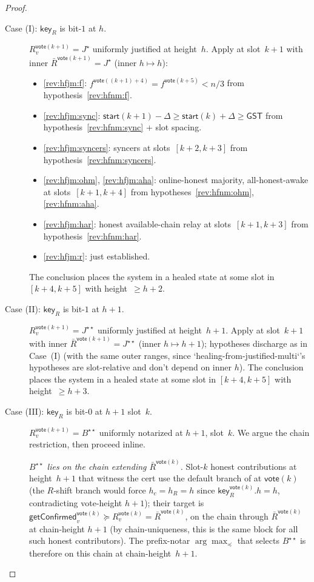\ifx\litemode\undefined\documentclass{article}\fi
\newcommand{\key}{\mathsf{key}}
\newcommand{\start}{\mathsf{start}}
\newcommand{\vote}{\mathsf{vote}}
\newcommand{\comm}[1]{\bar{#1}}
\newcommand{\getConfirmed}{\textsf{getConfirmed}\xspace}
\theoremstyle{plain}
\theoremstyle{definition}
\theoremstyle{remark}
\newcommand{\GST}{\ensuremath{\mathsf{GST}}}
\newcommand{\OHM}{online-honest majority\xspace}
\newcommand{\HAR}{honest available-chain relay\xspace}
\newcommand{\AHA}{all-honest-awake\xspace}
\begin{document}
\begin{proof}
\begin{description}
\item[{Case (I): $\key_R$ is bit-$1$ at $h$.}]\hfill

$R_v^{\vote(k+1)} = J^\star$ uniformly justified at height~$h$. Apply  at slot~$k+1$ with inner $\comm{R}^{\vote(k+1)} = J^\star$ (inner $h \mapsto h$):
\begin{itemize}
  \item \ref{rev:hfjm:f}: $f^{\vote((k+1)+4)} = f^{\vote(k+5)} < n/3$ from hypothesis~\ref{rev:hfnm:f}.
  \item \ref{rev:hfjm:sync}: $\start(k+1) - \Delta \geq \start(k) + \Delta \geq \GST$ from hypothesis~\ref{rev:hfnm:sync} + slot spacing.
  \item \ref{rev:hfjm:syncers}: syncers at slots~$[k+2, k+3]$ from hypothesis~\ref{rev:hfnm:syncers}.
  \item \ref{rev:hfjm:ohm}, \ref{rev:hfjm:aha}: \OHM, \AHA at slots~$[k+1, k+4]$ from hypotheses~\ref{rev:hfnm:ohm}, \ref{rev:hfnm:aha}.
  \item \ref{rev:hfjm:har}: \HAR at slots~$[k+1, k+3]$ from hypothesis~\ref{rev:hfnm:har}.
  \item \ref{rev:hfjm:r}: just established.
\end{itemize}
The conclusion places the system in a healed state at some slot in $[k+4, k+5]$ with height~$\geq h+2$.

\item[{Case (II): $\key_R$ is bit-$1$ at $h+1$.}]\hfill

$R_v^{\vote(k+1)} = J^{\star\star}$ uniformly justified at height~$h+1$. Apply  at slot~$k+1$ with inner $\comm{R}^{\vote(k+1)} = J^{\star\star}$ (inner $h \mapsto h+1$); hypotheses discharge as in Case~(I) (with the same outer ranges, since `healing-from-justified-multi`'s hypotheses are slot-relative and don't depend on inner $h$). The conclusion places the system in a healed state at some slot in $[k+4, k+5]$ with height~$\geq h+3$.

\item[{Case (III): $\key_R$ is bit-$0$ at $h+1$ slot~$k$.}]\hfill

$R_v^{\vote(k+1)} = B^{\star\star}$ uniformly notarized at $h+1$, slot~$k$. We argue the chain restriction, then proceed inline.

\emph{$B^{\star\star}$ lies on the chain extending $\comm{R}^{\vote(k)}$.}
Slot-$k$ honest contributions at height~$h+1$ that witness the cert use the default branch of  at $\vote(k)$ (the $R$-shift branch would force $h_c = h_R = h$ since $\key_R^{\vote(k)}.h = h$, contradicting vote-height $h+1$); their target is $\getConfirmed_v^{\vote(k)} \succeq R_v^{\vote(k)} = \comm{R}^{\vote(k)}$, on the chain through $\comm{R}^{\vote(k)}$ at chain-height $h+1$ (by chain-uniqueness, this is the same block for all such honest contributors). The prefix-notar $\arg\max_\preceq$ that selects $B^{\star\star}$ is therefore on this chain at chain-height~$h+1$.


\end{description}
\end{proof}
\end{document}
